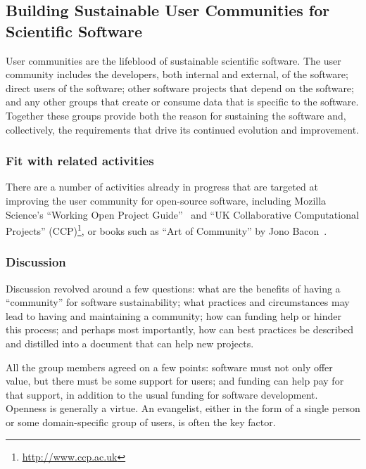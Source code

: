 \subsection{Building Sustainable User Communities for Scientific Software}


User communities are the lifeblood of sustainable scientific software. The user
community includes the developers, both internal and external, of the software;
direct users of the software; other software projects that depend on the
software; and any other groups that create or consume data that is specific to
the software. Together these groups provide both the reason for sustaining the
software and, collectively, the requirements that drive its continued evolution
and improvement.

\subsubsection{Fit with related activities}

There are a number of activities already in progress that are targeted at improving
the user community for open-source software, including Mozilla Science's ``Working Open Project
Guide''~\cite{working-open-wssspe3} and
``UK Collaborative Computational Projects'' (CCP)\footnote{\url{http://www.ccp.ac.uk}}, or 
 books such as ``Art of Community'' by Jono Bacon~\cite{art-of-community}. 

\subsubsection{Discussion}

Discussion revolved around a few questions: what are the benefits of having a
``community'' for software sustainability; what practices and circumstances may lead
to having and maintaining a community; how can funding help or hinder this
process; and perhaps most importantly, how can best practices be described and
distilled into a document that can help new projects.

All the group members agreed on a few points: software must not only offer value, but there
must be some support for users; and funding can help pay for that support, in
addition to the usual funding for software development. Openness is generally 
a virtue. An evangelist, either in the form of a single person or some
domain-specific group of users, is often the key factor.

